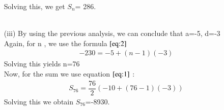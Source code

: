 \documentclass[journal,12pt,twocolumn]{IEEEtran}
\theoremstyle{remark}
\begin{document}
\begin{enumerate}
 Solving this, we get $S_n$= 286.\\\\

\item[(iii)]  
\vspace{0.5cm}
By using the previous analysis, we can conclude that a=-5, d=-3\\
Again, for n , we use the formula $\eqref{eq:2}$
\begin{align}
-230= -5+(n-1)(-3)
\end{align}
Solving this yields n=76\\
Now, for the sum we use equation $\eqref{eq:1}$ :\\
\begin{align}
    S_{76}=\dfrac{76}{2}(-10+(76-1)(-3))
    \end{align}
Solving this we obtain $S_{76}$=-8930.\\
\end{enumerate}



 

 
\end{document}
